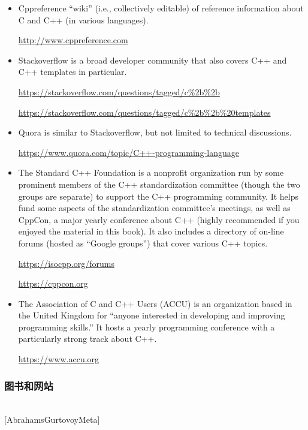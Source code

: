 \begin{itemize}
\item 
Cppreference “wiki” (i.e., collectively editable) of reference information about C and C++ (in various languages).

\url{http://www.cppreference.com}

\item
Stackoverflow is a broad developer community that also covers C++ and C++ templates in particular.

\url{https://stackoverflow.com/questions/tagged/c%2b%2b}

\url{https://stackoverflow.com/questions/tagged/c%2b%2b%20templates}

\item
Quora is similar to Stackoverflow, but not limited to technical discussions.

\url{https://www.quora.com/topic/C++-programming-language}

\item
The Standard C++ Foundation is a nonprofit organization run by some prominent members of the C++ standardization committee (though the two groups are separate) to support the C++ programming community. It helps fund some aspects of the standardization committee’s meetings, as well as CppCon, a major yearly conference about C++ (highly recommended if you enjoyed the material in this book). It also includes a directory of on-line forums (hosted as “Google groups”) that cover various C++ topics.

\url{https://isocpp.org/forums}

\url{https://cppcon.org}

\item
The Association of C and C++ Users (ACCU) is an organization based in the United Kingdom for “anyone interested in developing and improving programming skills.” It hosts a yearly programming conference with a particularly strong track about C++.

\url{https://www.accu.org}
\end{itemize}

\subsubsection*{图书和网站}

\hspace*{\fill} \\ %
{[AbrahamsGurtovoyMeta]}


